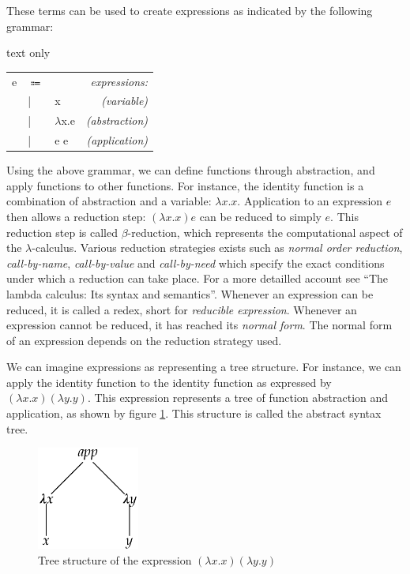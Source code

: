 These terms can be used to create expressions as indicated by the following grammar:
\begin{changemargin}{1cm}{0cm}
\begin{expansionno}{text only}
\begin{tabular}{l p{1cm} lr}
e       & $\Coloneqq$ &           &\textit{expressions:}\\
        & |     & x              &\textit{(variable)}\\
        & |     & $\lambda$x.e   &\textit{(abstraction)}\\
        & |     & e e            &\textit{(application)}\\
\end{tabular}
\end{expansionno}
\end{changemargin}

Using the above grammar, we can define functions through abstraction, and apply functions to other functions.
For instance, the identity function is a combination of abstraction and a variable: $\lambda x.x$.
Application to an expression $e$ then allows a reduction step: $(\lambda x.x) e$ can be reduced to simply $e$.
This reduction step is called $\beta$-reduction, which represents the computational aspect of the $\lambda$-calculus.
Various reduction strategies exists such as \textit{normal order reduction}, \textit{call-by-name}, \textit{call-by-value} and \textit{call-by-need} which specify the exact conditions under which a reduction can take place.
For a more detailled account see ``The lambda calculus: Its syntax and semantics''\cite{barendregt1985lambda}.
Whenever an expression can be reduced, it is called a redex, short for \textit{reducible expression}.
Whenever an expression cannot be reduced, it has reached its \textit{normal form}.
The normal form of an expression depends on the reduction strategy used.

We can imagine expressions as representing a tree structure.
For instance, we can apply the identity function to the identity function as expressed by $(\lambda x.x) (\lambda y.y)$.
This expression represents a tree of function abstraction and application, as shown by figure \ref{fig:tree}.
This structure is called the abstract syntax tree.

\begin{figure}[h]
\centering
\includegraphics[width=0.3\textwidth]{images/tree}
\caption{Tree structure of the expression $(\lambda x.x) (\lambda y.y)$} \label{fig:tree}
\end{figure}

